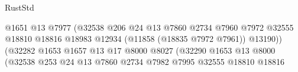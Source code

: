 \begin{lexlean}{RustStd}
\begin{coremodule}
                                                          @1651
                                                          @13
                                                          @7977
                                                          (@32538
                                                            @206
                                                            @24
                                                            @13
                                                            @7860
                                                            @2734
                                                            @7960
                                                            @7972
                                                            @32555
                                                            @18810
                                                            @18816
                                                            @18983
                                                            @12934
                                                            (@11858 (@18835 @7972 @7961))
                                                            @13190))
                                                        (@32282
                                                          @1653
                                                          @1657
                                                          @13
                                                          @17
                                                          @8000
                                                          @8027
                                                          (@32290
                                                            @1653
                                                            @13
                                                            @8000
                                                            (@32538
                                                              @253
                                                              @24
                                                              @13
                                                              @7860
                                                              @2734
                                                              @7982
                                                              @7995
                                                              @32555
                                                              @18810
                                                              @18816

\end{coremodule}
\end{lexlean}
